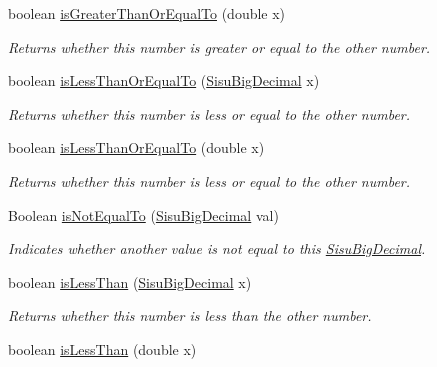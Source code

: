 \begin{DoxyCompactItemize}
boolean \hyperlink{classcom_1_1aarrelaakso_1_1drawl_1_1_sisu_big_decimal_a45b9c8df4d34618db924c5d1b460a1ed}{is\+Greater\+Than\+Or\+Equal\+To} (double x)
\begin{DoxyCompactList}\small\item\em Returns whether this number is greater or equal to the other number. \end{DoxyCompactList}\item 
boolean \hyperlink{classcom_1_1aarrelaakso_1_1drawl_1_1_sisu_big_decimal_ac809a1deb4723c852a7737e9a40eb57e}{is\+Less\+Than\+Or\+Equal\+To} (\hyperlink{classcom_1_1aarrelaakso_1_1drawl_1_1_sisu_big_decimal}{Sisu\+Big\+Decimal} x)
\begin{DoxyCompactList}\small\item\em Returns whether this number is less or equal to the other number. \end{DoxyCompactList}\item 
boolean \hyperlink{classcom_1_1aarrelaakso_1_1drawl_1_1_sisu_big_decimal_a2644e7161a3022a10d2fa99f95ba051e}{is\+Less\+Than\+Or\+Equal\+To} (double x)
\begin{DoxyCompactList}\small\item\em Returns whether this number is less or equal to the other number. \end{DoxyCompactList}\item 
Boolean \hyperlink{classcom_1_1aarrelaakso_1_1drawl_1_1_sisu_big_decimal_a855e56f2f721da7239fb0f41f42dc705}{is\+Not\+Equal\+To} (\hyperlink{classcom_1_1aarrelaakso_1_1drawl_1_1_sisu_big_decimal}{Sisu\+Big\+Decimal} val)
\begin{DoxyCompactList}\small\item\em Indicates whether another value is not equal to this \hyperlink{classcom_1_1aarrelaakso_1_1drawl_1_1_sisu_big_decimal}{Sisu\+Big\+Decimal}. \end{DoxyCompactList}\item 
boolean \hyperlink{classcom_1_1aarrelaakso_1_1drawl_1_1_sisu_big_decimal_acd8d9994b3096998bb2a059d2782e883}{is\+Less\+Than} (\hyperlink{classcom_1_1aarrelaakso_1_1drawl_1_1_sisu_big_decimal}{Sisu\+Big\+Decimal} x)
\begin{DoxyCompactList}\small\item\em Returns whether this number is less than the other number. \end{DoxyCompactList}\item 
boolean \hyperlink{classcom_1_1aarrelaakso_1_1drawl_1_1_sisu_big_decimal_a52d08adc0b258586bda854b6a4e31e9e}{is\+Less\+Than} (double x)

\end{DoxyCompactItemize}
